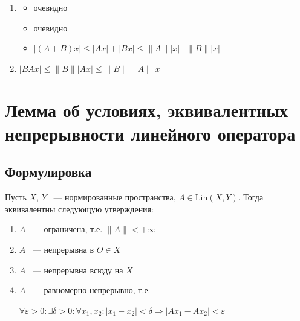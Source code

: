 \documentclass{article}
\begin{document}
            \begin{enumerate}
            
                \item 
                
                    \begin{itemize}
                    
                        \item очевидно
                        
                        \item очевидно
                        
                        \item $|(A + B) x| \leq |A x| + |Bx| \leq \| A \| |x| + \| B \| |x|$
                        
                    \end{itemize}
                
                \item $|BAx| \leq \| B \| |Ax| \leq \| B \| \| A \| |x|$
                
            \end{enumerate}
        
    \newpage
    
    \section{Лемма об условиях, эквивалентных непрерывности линейного оператора}
    
        \subsection{Формулировка}
        
            Пусть $X$, $Y$ ~--- нормированные пространства, $A \in \mathrm{Lin}(X, Y)$. Тогда эквивалентны следующую утверждения:
            
            \begin{enumerate}
            
                \item $A$ ~--- ограничена, т.е. $\| A \| < +\infty$
                
                \item $A$ ~--- непрерывна в $O \in X$
                
                \item $A$ ~--- непрерывна всюду на $X$
                
                \item $A$ ~--- равномерно непрерывно, т.е.
                
                    $\forall \varepsilon > 0 : \exists \delta > 0 : \forall x_1, x_2 : |x_1 - x_2| < \delta \Rightarrow |Ax_1 - Ax_2| < \varepsilon$
                    
            \end{enumerate}
        
\end{document}
